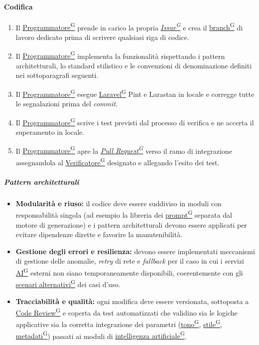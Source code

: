 \documentclass[a4paper,12pt]{article}
\providecommand{\glslink}[2]{\href{https://alittlebyte-19.github.io/Documentazione/glossario.html\#gls-#1}{\underline{#2}\textsuperscript{\scriptsize G}}}
\begin{document}
\paragraph{Codifica}
\begin{enumerate}
    \item Il \glslink{programmatore}{Programmatore} prende in carico la propria \textit{\glslink{issue}{Issue}} e crea il \glslink{branch}{branch} di lavoro dedicato prima di scrivere qualsiasi riga di codice.
    \item Il \glslink{programmatore}{Programmatore} implementa la funzionalità rispettando i pattern architetturali, lo standard stilistico e le convenzioni di denominazione definiti nei sottoparagrafi seguenti.
    \item Il \glslink{programmatore}{Programmatore} esegue \glslink{laravel}{Laravel} Pint e Larastan in locale e corregge tutte le segnalazioni prima del \textit{commit}.
    \item Il \glslink{programmatore}{Programmatore} scrive i test previsti dal processo di verifica e ne accerta il superamento in locale.
    \item Il \glslink{programmatore}{Programmatore} apre la \textit{\glslink{pull-request}{Pull Request}} verso il ramo di integrazione assegnandola al \glslink{verificatore}{Verificatore} designato e allegando l'esito dei test.
\end{enumerate}

\subparagraph{Pattern architetturali}
\begin{itemize}
    \item \textbf{Modularità e riuso:} il codice deve essere suddiviso in moduli con responsabilità singola (ad esempio la libreria dei \glslink{prompt}{prompt} separata dal motore di generazione) e i pattern architetturali devono essere applicati per evitare dipendenze dirette e favorire la manutenibilità.
    \item \textbf{Gestione degli errori e resilienza:} devono essere implementati meccanismi di gestione delle anomalie, \textit{retry} di rete e \textit{fallback} per il caso in cui i servizi \glslink{intelligenza-artificiale-ai}{AI} esterni non siano temporaneamente disponibili, coerentemente con gli \glslink{scenario-alternativo}{scenari alternativi} dei casi d'uso.
    \item \textbf{Tracciabilità e qualità:} ogni modifica deve essere versionata, sottoposta a \glslink{code-review}{Code Review} e coperta da test automatizzati che validino sia le logiche applicative sia la corretta integrazione dei parametri (\glslink{tono-comunicativo}{tono}, \glslink{stile-editoriale}{stile}, \glslink{metadati}{metadati}) passati ai moduli di \glslink{intelligenza-artificiale-ai}{intelligenza artificiale}.
\end{itemize}
\end{document}
